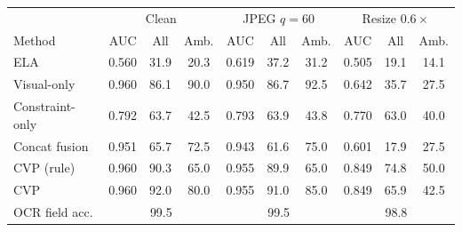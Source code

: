 \begin{tabular}{lccccccccc}
\toprule
 & \multicolumn{3}{c}{Clean} & \multicolumn{3}{c}{JPEG $q{=}60$} & \multicolumn{3}{c}{Resize $0.6\times$}\\
Method & AUC & All & Amb. & AUC & All & Amb. & AUC & All & Amb.\\
\midrule
ELA & 0.560 & 31.9 & 20.3 & 0.619 & 37.2 & 31.2 & 0.505 & 19.1 & 14.1\\
Visual-only & 0.960 & 86.1 & 90.0 & 0.950 & 86.7 & 92.5 & 0.642 & 35.7 & 27.5\\
Constraint-only & 0.792 & 63.7 & 42.5 & 0.793 & 63.9 & 43.8 & 0.770 & 63.0 & 40.0\\
Concat fusion & 0.951 & 65.7 & 72.5 & 0.943 & 61.6 & 75.0 & 0.601 & 17.9 & 27.5\\
CVP (rule) & 0.960 & 90.3 & 65.0 & 0.955 & 89.9 & 65.0 & 0.849 & 74.8 & 50.0\\
CVP & 0.960 & 92.0 & 80.0 & 0.955 & 91.0 & 85.0 & 0.849 & 65.9 & 42.5\\
\midrule
OCR field acc. & \multicolumn{3}{c}{99.5} & \multicolumn{3}{c}{99.5} & \multicolumn{3}{c}{98.8}\\
\bottomrule
\end{tabular}
